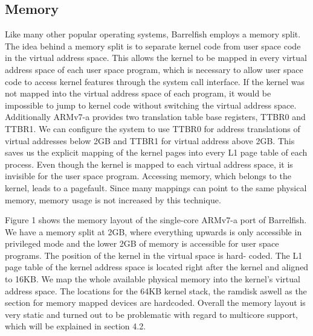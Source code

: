 \documentclass[a4paper,twoside]{report} %
\begin{document}
\subsection{Memory}

Like many other popular operating systems, Barrelfish employs a memory
split. The idea behind a memory split is to separate kernel code from
user space code in the virtual address space. This allows the kernel
to be mapped in every virtual address space of each user space
program, which is necessary to allow user space code to access kernel
features through the system call interface. If the kernel was not
mapped into the virtual address space of each program, it would be
impossible to jump to kernel code without switching the virtual
address space. Additionally ARMv7-a provides two translation table
base registers, TTBR0 and TTBR1. We can configure the system to use
TTBR0 for address translations of virtual addresses below 2GB and
TTBR1 for virtual address above 2GB. This saves us the explicit
mapping of the kernel pages into every L1 page table of each process.
Even though the kernel is mapped to each virtual address space, it is
invisible for the user space program. Accessing memory, which belongs
to the kernel, leads to a pagefault. Since many mappings can point to
the same physical memory, memory usage is not increased by this
technique. 


Figure 1 shows the memory layout of the single-core ARMv7-a port of
Barrelfish. We have a memory split at 2GB, where everything upwards is
only accessible in privileged mode and the lower 2GB of memory is
accessible for user space programs. The position of the kernel in the
virtual space is hard- coded. The L1 page table of the kernel address
space is located right after the kernel and aligned to 16KB. We map
the whole available physical memory into the kernel’s virtual address
space. The locations for the 64KB kernel stack, the ramdisk aswell as
the section for memory mapped devices are hardcoded.  Overall the
memory layout is very static and turned out to be problematic with
regard to multicore support, which will be explained in section 4.2.
\end{document}
